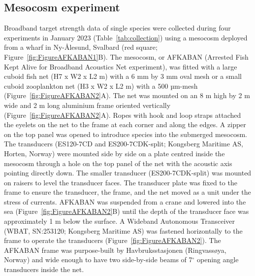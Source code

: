 {


\subsection{Mesocosm experiment}
Broadband target strength data of single species were collected during four experiments in January 2023 (Table~\ref{tab:collection}) using a mesocosm deployed from a wharf in Ny-Ålesund, Svalbard (red square; Figure~\ref{fig:FigureAFKABAN1}B). The mesocosm, or AFKABAN (Arrested Fish Kept Alive for Broadband Acoustics Net experiment), was fitted with a large cuboid fish net (H7 x W2 x L2 m) with a 6 mm by 3 mm oval mesh or a small cuboid zooplankton net (H3 x W2 x L2 m) with a 500 µm-mesh (Figure~\ref{fig:FigureAFKABAN2}A). The net was mounted on an 8 m high by 2 m wide and 2 m long aluminium frame oriented vertically (Figure~\ref{fig:FigureAFKABAN2}A). Ropes with hook and loop straps attached the eyelets on the net to the frame at each corner and along the edges. A zipper on the top panel was opened to introduce species into the submerged mesocosm. \\ 
The transducers (ES120-7CD and ES200-7CDK-split; Kongsberg Maritime AS, Horten, Norway) were mounted side by side on a plate centred inside the mesocosm through a hole on the top panel of the net with the acoustic axis pointing directly down. The smaller transducer (ES200-7CDK-split) was mounted on raisers to level the transducer faces. The transducer plate was fixed to the frame to ensure the transducer, the frame, and the net moved as a unit under the stress of currents. AFKABAN was suspended from a crane and lowered into the sea (Figure~\ref{fig:FigureAFKABAN2}B) until the depth of the transducer face was approximately 1 m below the surface. A Wideband Autonomous Transceiver (WBAT, SN:253120; Kongsberg Maritime AS) was fastened horizontally to the frame to operate the transducers (Figure~\ref{fig:FigureAFKABAN2}). The AFKABAN frame was purpose-built by Havbruksstasjonen (Ringvassøya, Norway) and wide enough to have two side-by-side beams of 7$^{\circ}$ opening angle transducers inside the net. \\
}
